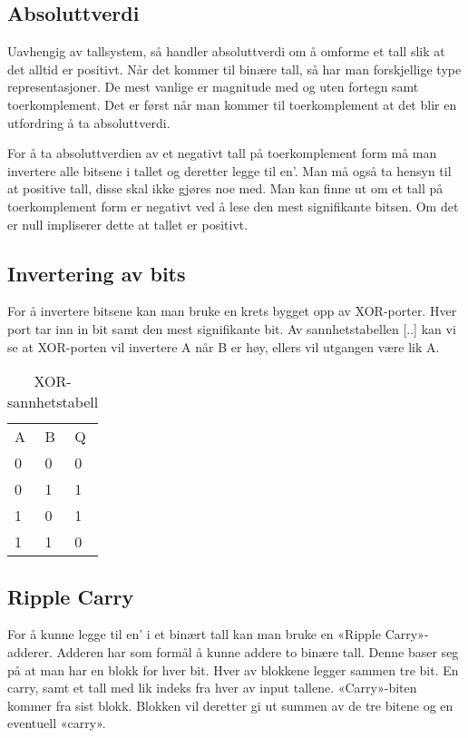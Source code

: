 \documentclass{article}
\begin{document}
\subsection{Absoluttverdi}
Uavhengig av tallsystem, så handler absoluttverdi om å omforme et tall slik at det alltid er positivt. Når det kommer til binære tall, så har man forskjellige type representasjoner. De mest vanlige er magnitude med og uten fortegn samt toerkomplement. Det er først når man kommer til toerkomplement at det blir en utfordring å ta absoluttverdi.

For å ta absoluttverdien av et negativt tall på toerkomplement form må man invertere alle bitsene i tallet og deretter legge til en’. Man må også ta hensyn til at positive tall, disse skal ikke gjøres noe med. Man kan finne ut om et tall på toerkomplement form er negativt ved å lese den mest signifikante bitsen. Om det er null impliserer dette at tallet er positivt.

\subsection{Invertering av bits}
For å invertere bitsene kan man bruke en krets bygget opp av XOR-porter. Hver port tar inn in bit samt den mest signifikante bit. Av sannhetstabellen [..] kan vi se at XOR-porten vil invertere A når B er høy, ellers vil utgangen være lik A.

\begin{table}[h]
\centering
\caption{XOR-sannhetstabell}
\label{my-label}
\begin{tabular}{lll}
A & B & Q \\
0 & 0 & 0 \\
0 & 1 & 1 \\
1 & 0 & 1 \\
1 & 1 & 0
\end{tabular}
\end{table}

\subsection{Ripple Carry}
For å kunne legge til en’ i et binært tall kan man bruke en «Ripple Carry»-adderer. Adderen har som formål å kunne addere to binære tall. Denne baser seg på at man har en blokk for hver bit. Hver av blokkene legger sammen tre bit. En carry, samt et tall med lik indeks fra hver av input tallene. «Carry»-biten kommer fra sist blokk. Blokken vil deretter gi ut summen av de tre bitene og en eventuell «carry».
\end{document}

